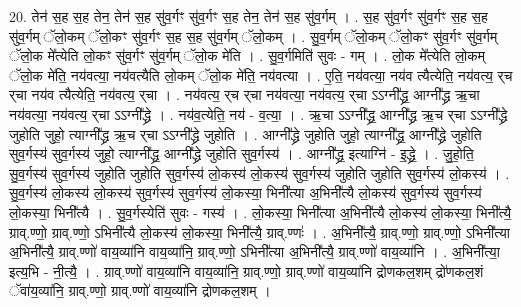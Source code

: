 \documentclass[17pt]{extarticle}
\begin{document}
20. तेन॑ स॒ह स॒ह तेन॒ तेन॑ स॒ह सु॑व॒र्गꣳ सु॑व॒र्गꣳ स॒ह तेन॒ तेन॑ स॒ह सु॑व॒र्गम् । . स॒ह सु॑व॒र्गꣳ सु॑व॒र्गꣳ स॒ह स॒ह सु॑व॒र्गम् ॅलो॒कम् ॅलो॒कꣳ सु॑व॒र्गꣳ स॒ह स॒ह सु॑व॒र्गम् ॅलो॒कम् । . सु॒व॒र्गम् ॅलो॒कम् ॅलो॒कꣳ सु॑व॒र्गꣳ सु॑व॒र्गम् ॅलो॒क मे᳚त्येति लो॒कꣳ सु॑व॒र्गꣳ सु॑व॒र्गम् ॅलो॒क मे॑ति । . सु॒व॒र्गमिति॑ सुवः - गम् । . लो॒क मे᳚त्येति लो॒कम् ॅलो॒क मे॑ति॒ नय॑वत्या॒ नय॑वत्यैति लो॒कम् ॅलो॒क मे॑ति॒ नय॑वत्या । . ए॒ति॒ नय॑वत्या॒ नय॑व त्यैत्येति॒ नय॑वत्य॒ र्‌च र्‌चा नय॑व त्यैत्येति॒ नय॑वत्य॒ र्‌चा । . नय॑वत्य॒ र्‌च र्‌चा नय॑वत्या॒ नय॑वत्य॒ र्‌चा ऽऽग्नी᳚द्ध्र॒ आग्नी᳚द्ध्र ऋ॒चा नय॑वत्या॒ नय॑वत्य॒ र्‌चा ऽऽग्नी᳚द्ध्रे । . नय॑व॒त्येति॒ नय॑ - व॒त्या॒ । . ऋ॒चा ऽऽग्नी᳚द्ध्र॒ आग्नी᳚द्ध्र ऋ॒च र्‌चा ऽऽग्नी᳚द्ध्रे जुहोति जुहो॒ त्याग्नी᳚द्ध्र ऋ॒च र्‌चा ऽऽग्नी᳚द्ध्रे जुहोति । . आग्नी᳚द्ध्रे जुहोति जुहो॒ त्याग्नी᳚द्ध्र॒ आग्नी᳚द्ध्रे जुहोति सुव॒र्गस्य॑ सुव॒र्गस्य॑ जुहो॒ त्याग्नी᳚द्ध्र॒ आग्नी᳚द्ध्रे जुहोति सुव॒र्गस्य॑ । . आग्नी᳚द्ध्र॒ इत्याग्नि॑ - इ॒द्ध्रे॒ । . जु॒हो॒ति॒ सु॒व॒र्गस्य॑ सुव॒र्गस्य॑ जुहोति जुहोति सुव॒र्गस्य॑ लो॒कस्य॑ लो॒कस्य॑ सुव॒र्गस्य॑ जुहोति जुहोति सुव॒र्गस्य॑ लो॒कस्य॑ । . सु॒व॒र्गस्य॑ लो॒कस्य॑ लो॒कस्य॑ सुव॒र्गस्य॑ सुव॒र्गस्य॑ लो॒कस्या॒ भिनी᳚त्या अ॒भिनी᳚त्यै लो॒कस्य॑ सुव॒र्गस्य॑ सुव॒र्गस्य॑ लो॒कस्या॒ भिनी᳚त्यै । . सु॒व॒र्गस्येति॑ सुवः - गस्य॑ । . लो॒कस्या॒ भिनी᳚त्या अ॒भिनी᳚त्यै लो॒कस्य॑ लो॒कस्या॒ भिनी᳚त्यै॒ ग्राव्.ण्णो॒ ग्राव्.ण्णो॒ ऽभिनी᳚त्यै लो॒कस्य॑ लो॒कस्या॒ भिनी᳚त्यै॒ ग्राव्.ण्णः॑ । . अ॒भिनी᳚त्यै॒ ग्राव्.ण्णो॒ ग्राव्.ण्णो॒ ऽभिनी᳚त्या अ॒भिनी᳚त्यै॒ ग्राव्.ण्णो॑ वाय॒व्या॑नि वाय॒व्या॑नि॒ ग्राव्.ण्णो॒ ऽभिनी᳚त्या अ॒भिनी᳚त्यै॒ ग्राव्.ण्णो॑ वाय॒व्या॑नि । . अ॒भिनी᳚त्या॒ इत्य॒भि - नी॒त्यै॒ । . ग्राव्.ण्णो॑ वाय॒व्या॑नि वाय॒व्या॑नि॒ ग्राव्.ण्णो॒ ग्राव्.ण्णो॑ वाय॒व्या॑नि द्रोणकल॒शम् द्रो॑णकल॒शं ॅवा॑य॒व्या॑नि॒ ग्राव्.ण्णो॒ ग्राव्.ण्णो॑ वाय॒व्या॑नि द्रोणकल॒शम् । \newline
\end{document}
